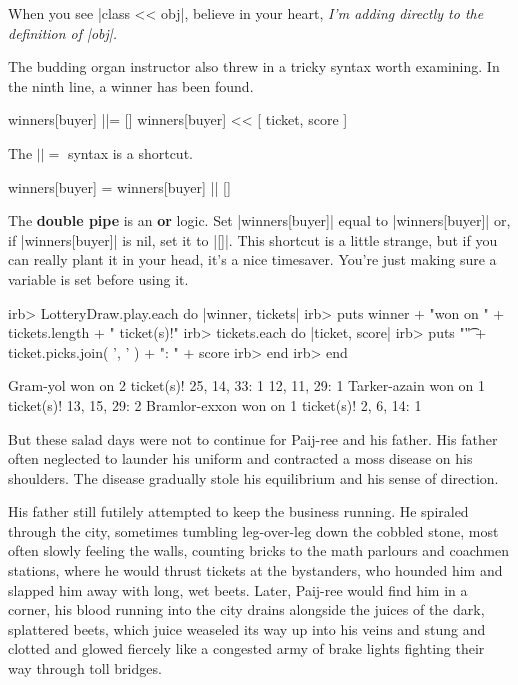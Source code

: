 \documentclass[12pt,twoside]{report}
\begin{document}
When you see \rubyinline|class << obj|, believe in
your heart, {\em I'm adding directly to the definition of
  \rubyinline|obj|.}

The budding organ instructor also threw in a tricky syntax worth
examining. In the ninth line, a winner has been found.


\begin{rubycode}

 winners[buyer] ||= []
 winners[buyer] << [ ticket, score ]

\end{rubycode}


The \rubyinline$||=$ syntax is a shortcut.


\begin{rubycode}

 winners[buyer] = winners[buyer] || []

\end{rubycode}


The {\bf double pipe} is an {\bf or} logic.  Set
\rubyinline|winners[buyer]| equal to
\rubyinline|winners[buyer]| or, if
\rubyinline|winners[buyer]| is nil, set it to
\rubyinline|[]|.  This shortcut is a little strange,
but if you can really plant it in your head, it's a nice timesaver.
You're just making sure a variable is set before using it.


\begin{consolecode}

 irb> LotteryDraw.play.each do |winner, tickets|
 irb>   puts winner + "won on " + tickets.length + " ticket(s)!"
 irb>   tickets.each do |ticket, score|
 irb>     puts "\t" + ticket.picks.join( ', ' ) + ": " + score
 irb>   end
 irb> end

 Gram-yol won on 2 ticket(s)!
     25, 14, 33: 1
     12, 11, 29: 1
 Tarker-azain won on 1 ticket(s)!
     13, 15, 29: 2
 Bramlor-exxon won on 1 ticket(s)!
     2, 6, 14: 1

\end{consolecode}


But these salad days were not to continue for Paij-ree and his father.
His father often neglected to launder his uniform and contracted a
moss disease on his shoulders.  The disease gradually stole his
equilibrium and his sense of direction.

His father still futilely attempted to keep the business running.  He
spiraled through the city, sometimes tumbling leg-over-leg down the
cobbled stone, most often slowly feeling the walls, counting bricks to
the math parlours and coachmen stations, where he would thrust tickets
at the bystanders, who hounded him and slapped him away with long, wet
beets.  Later, Paij-ree would find him in a corner, his blood running
into the city drains alongside the juices of the dark, splattered
beets, which juice weaseled its way up into his veins and stung and
clotted and glowed fiercely like a congested army of brake lights
fighting their way through toll bridges.
\end{document}
